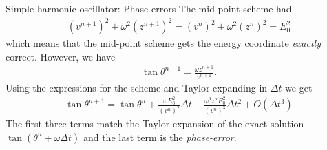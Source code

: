 \documentclass[aspectratio=43]{beamer}
\begin{document}
\begin{frame}{Simple harmonic oscillator: Phase-errors}
  \small%
  The mid-point scheme had
  \begin{align*}
    (v^{n+1})^2 + \omega^2 (z^{n+1})^2 = (v^{n})^2 + \omega^2 (z^{n})^2
    = E_0^2
  \end{align*}
  which means that the mid-point scheme gets the energy coordinate
  \emph{exactly} correct. However, we have
  \begin{align*}
    \tan\theta^{n+1} = \frac{\omega z^{n+1}}{v^{n+1}}.
  \end{align*}
  Using the expressions for the scheme and Taylor expanding in
  $\Delta t$ we get
  \begin{align*}
    \tan\theta^{n+1}
    =
    \tan\theta^n +
    \frac{\omega E_0^2}{(v^{n})^2}\Delta t +
    \frac{\omega^3 z^n E_0^2}{(v^n)^3}\Delta t^2
    + O(\Delta t^3)
  \end{align*}
  The first three terms match the Taylor expansion of the exact
  solution $\tan(\theta^n+\omega\Delta t)$ and the last term is the
  \emph{phase-error}.
\end{frame}
\end{document}
